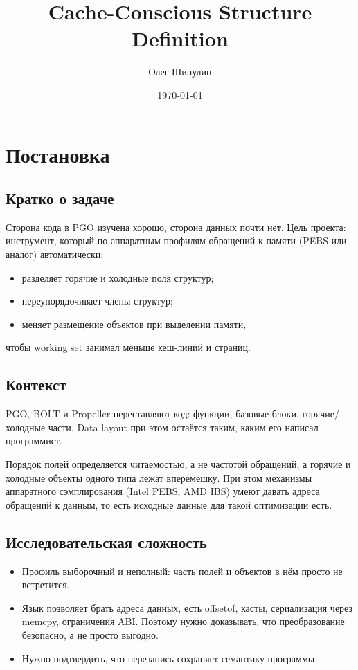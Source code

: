 \documentclass[a4paper,12pt]{article}
\title{Cache-Conscious Structure Definition}
\author{Олег Шипулин}
\date{\today}
\begin{document}
\maketitle
\tableofcontents
\newpage


\section{Постановка}

\subsection{Кратко о задаче}

Сторона кода в PGO изучена хорошо, сторона данных почти нет. Цель проекта: инструмент, который по аппаратным профилям обращений к памяти (PEBS или аналог) автоматически:

\begin{itemize}
    \item разделяет горячие и холодные поля структур;
    \item переупорядочивает члены структур;
    \item меняет размещение объектов при выделении памяти,
\end{itemize}

чтобы working set занимал меньше кеш-линий и страниц.

\subsection{Контекст}

PGO, BOLT и Propeller переставляют код: функции, базовые блоки, горячие/холодные части. Data layout при этом остаётся таким, каким его написал программист. 

Порядок полей определяется читаемостью, а не частотой обращений, а горячие и холодные объекты одного типа лежат вперемешку. При этом механизмы аппаратного сэмплирования (Intel PEBS, AMD IBS) умеют давать адреса обращений к данным, то есть исходные данные для такой оптимизации есть.

\subsection{Исследовательская сложность}

\begin{itemize}
    \item Профиль выборочный и неполный: часть полей и объектов в нём просто не встретится.
    \item Язык позволяет брать адреса данных, есть offsetof, касты, сериализация через memcpy, ограничения ABI. Поэтому нужно доказывать, что преобразование безопасно, а не просто выгодно.
    \item Нужно подтвердить, что перезапись сохраняет семантику программы.
\end{itemize}
\end{document}
